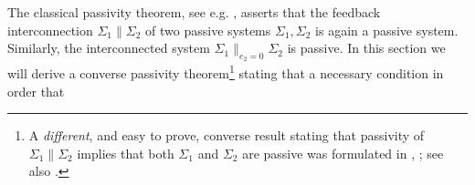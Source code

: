 \documentclass[11pt]{article}
\newtheorem{proposition}[lemma]{Proposition}
\newtheorem{remark}[lemma]{Remark}
\newcommand{\Ltwoe}{\boldsymbol{\rm L}_{2e}}
\begin{document}
The classical passivity theorem, see e.g. \cite{Sch17}, asserts that the feedback interconnection $\Sigma_1 \| \Sigma_2$ of two passive systems $\Sigma_1, \Sigma_2$ is again a passive system. Similarly, the interconnected system $\Sigma_1 \|_{e_2=0} \Sigma_2$ is passive. 
In this section we will derive a converse passivity theorem\footnote{A {\it different}, and easy to prove, converse result stating that passivity of $\Sigma_1 \| \Sigma_2$ implies that both $\Sigma_1$ and $\Sigma_2$ are passive was formulated in \cite{kerber-vds11}, \cite{Kho-Sch16}; see also \cite[Proposition 4.3.8]{Sch17}.} stating that a necessary condition in order that
\end{document}

